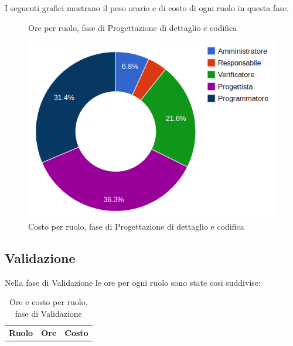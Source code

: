 I seguenti grafici mostrano il peso orario e di costo di ogni ruolo in questa fase.

\begin{figure}[H]
\begin{tikzpicture}

	

\end{tikzpicture}
\caption{Ore per ruolo, fase di Progettazione di dettaglio e codifica}
\end{figure}

\begin{figure}[H]
\centering
\includegraphics[scale=0.35]{5-3-2.png}
\caption{Costo per ruolo, fase di Progettazione di dettaglio e codifica\label{fig:nome}}
\end{figure}

\subsection{Validazione}

Nella fase di Validazione le ore per ogni ruolo sono state cosi suddivise:

\begin{table}[H]
	\centering
	\begin{tabular}{ l c c }
	\textbf{Ruolo} & \textbf{Ore} & \textbf{Costo} \\
	
		
	
	\end{tabular}
	\caption{Ore e costo per ruolo, fase di Validazione}
	\end{table}

